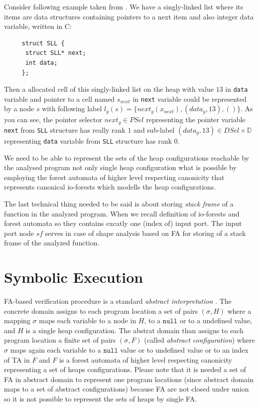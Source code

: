 Consider following example taken from \cite{cav13tr}.
We have a singly-linked list where its items are data structures containing pointers to
a next item and also integer data variable, written in C:
\begin{center}
\begin{minipage}{0.3\textwidth}
    \begin{verbatim}
     struct SLL {
      struct SLL* next;
      int data;
     };
    \end{verbatim}
\end{minipage}
\end{center}
Then a allocated cell of this singly-linked list on the heap with value $13$ in \texttt{data} variable and pointer to a cell named $s_{next}$
in \texttt{next} variable could be represented
by a node $s$ with following label $l_g(s) = \{next_g(x_{next}),(data_g,13),()\}$.
As you can see, the pointer selector $next_g \in PSel$ representing the pointer variable \texttt{next} from \texttt{SLL} structure
has really rank $1$ and sub-label $(data_g,13) \in DSel\times \mathbb{D}$ representing \texttt{data} variable from \texttt{SLL} structure
has rank $0$.

We need to be able to represent the sets of the heap configurations reachable by the analysed program not only single heap configuration
what is possible by employing the forest automata of higher level respecting canonicity that represents canonical io-forests
which modells the heap configurations.

The last technical thing needed to be said is about storing \emph{stack frame} of a function in the analyzed program.
When we recall definition of io-forests and forest automata so they contains excatly one (index of) input port.
The input port node $sf$ serves in case of shape analysis based on FA for storing of a stack frame of the analyzed function.

\section{Symbolic Execution}
\label{sec:se}

FA-based verification procedure is a standard \emph{abstract interpretation} \cite{cuso}.
The concrete domain assigns to each program location a set of pairs
$(\sigma,H)$ where a mapping $\sigma$ maps each variable
to a node in $H$, to a $\texttt{null}$ or to a undefined value, and $H$ is a single heap configuration.
The abstrat domain than assigns to each program location a finite set of pairs
$(\sigma, F)$ (called \emph{abstract configuration}) where $\sigma$ maps again each variable to a
$\texttt{null}$ value or to undefined value or to an index of TA in $F$ and $F$ is a forest automata
of higher level respecting canonicity representing a set of heaps configurations.
Please note that it is needed a set of FA in abstract domain to represent one program locations (since
abstract domain maps to a set of abstract configurations) because FA are not closed under union so it
is not possible to represent the sets of heaps by single FA.

